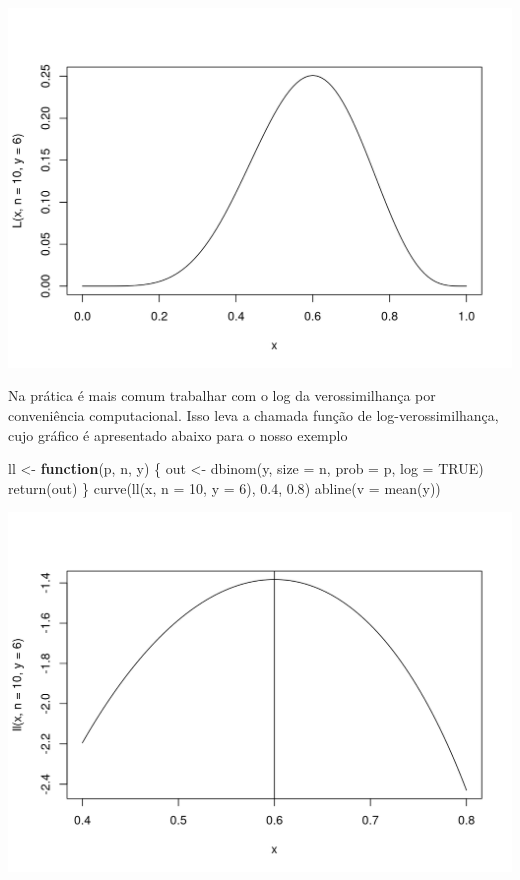 \documentclass[
  10pt,
  a4paper]{book}
\newenvironment{Shaded}{\begin{snugshade}}{\end{snugshade}}
\newcommand{\AttributeTok}[1]{\textcolor[rgb]{0.77,0.63,0.00}{#1}}
\newcommand{\ConstantTok}[1]{\textcolor[rgb]{0.00,0.00,0.00}{#1}}
\newcommand{\ControlFlowTok}[1]{\textcolor[rgb]{0.13,0.29,0.53}{\textbf{#1}}}
\newcommand{\DecValTok}[1]{\textcolor[rgb]{0.00,0.00,0.81}{#1}}
\newcommand{\FloatTok}[1]{\textcolor[rgb]{0.00,0.00,0.81}{#1}}
\newcommand{\FunctionTok}[1]{\textcolor[rgb]{0.00,0.00,0.00}{#1}}
\newcommand{\NormalTok}[1]{#1}
\newcommand{\OtherTok}[1]{\textcolor[rgb]{0.56,0.35,0.01}{#1}}
\begin{document}
\begin{center}\includegraphics{figures/unnamed-chunk-376-1} \end{center}

Na prática é mais comum trabalhar com o log da verossimilhança por conveniência computacional. Isso leva a chamada função de log-verossimilhança, cujo gráfico é apresentado abaixo para o nosso exemplo

\begin{Shaded}
\begin{Highlighting}[]
\NormalTok{ll }\OtherTok{\textless{}{-}} \ControlFlowTok{function}\NormalTok{(p, n, y) \{}
\NormalTok{  out }\OtherTok{\textless{}{-}} \FunctionTok{dbinom}\NormalTok{(y, }\AttributeTok{size =}\NormalTok{ n, }\AttributeTok{prob =}\NormalTok{ p, }\AttributeTok{log =} \ConstantTok{TRUE}\NormalTok{)}
  \FunctionTok{return}\NormalTok{(out)}
\NormalTok{\}}
\FunctionTok{curve}\NormalTok{(}\FunctionTok{ll}\NormalTok{(x, }\AttributeTok{n =} \DecValTok{10}\NormalTok{, }\AttributeTok{y =} \DecValTok{6}\NormalTok{), }\FloatTok{0.4}\NormalTok{, }\FloatTok{0.8}\NormalTok{)}
\FunctionTok{abline}\NormalTok{(}\AttributeTok{v =} \FunctionTok{mean}\NormalTok{(y))}
\end{Highlighting}
\end{Shaded}

\begin{center}\includegraphics{figures/unnamed-chunk-377-1} \end{center}
\end{document}
